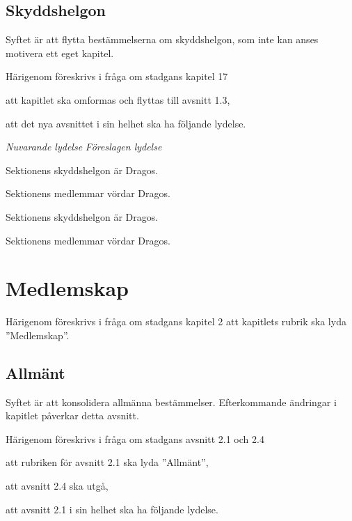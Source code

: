 \documentclass{article}
\newenvironment{lydelse}
    {\begin{paracol}{2}%
        \emph{Nuvarande lydelse}%
        \switchcolumn%
        \emph{Föreslagen lydelse}%
    \end{paracol}%
    \begin{enumerate}[label=\thesubsection.\arabic*]%
    \begin{paracol}{2}%
    }{\end{paracol}\end{enumerate}}
\begin{document}
\subsection{Skyddshelgon}
Syftet är att flytta bestämmelserna om skyddshelgon, som inte kan anses motivera ett eget kapitel.

Härigenom föreskrivs i fråga om stadgans kapitel 17
\begin{dels}
    \item att kapitlet ska omformas och flyttas till avsnitt 1.3,
    \item att det nya avsnittet i sin helhet ska ha följande lydelse.
\end{dels}

\begin{lydelse}
  \setcounter{section}{17}
  \setcounter{subsection}{1}
    \item Sektionens skyddshelgon är Dragos.
    \item Sektionens medlemmar vördar Dragos.
  \setcounter{section}{1}
  \setcounter{subsection}{3}
  \switchcolumn   
  \setcounter{enumi}{0}
    \item Sektionens skyddshelgon är Dragos.
    \item Sektionens medlemmar vördar Dragos.
\end{lydelse}

\section{Medlemskap}
Härigenom föreskrivs i fråga om stadgans kapitel 2 att kapitlets rubrik ska lyda ''Medlemskap''.

\subsection{Allmänt}
Syftet är att konsolidera allmänna bestämmelser.
Efterkommande ändringar i kapitlet påverkar detta avsnitt.

Härigenom föreskrivs i fråga om stadgans avsnitt 2.1 och 2.4
\begin{dels}
    \item att rubriken för avsnitt 2.1 ska lyda ''Allmänt'',
    \item att avsnitt 2.4 ska utgå,
    \item att avsnitt 2.1 i sin helhet ska ha följande lydelse.
\end{dels}
\end{document}

